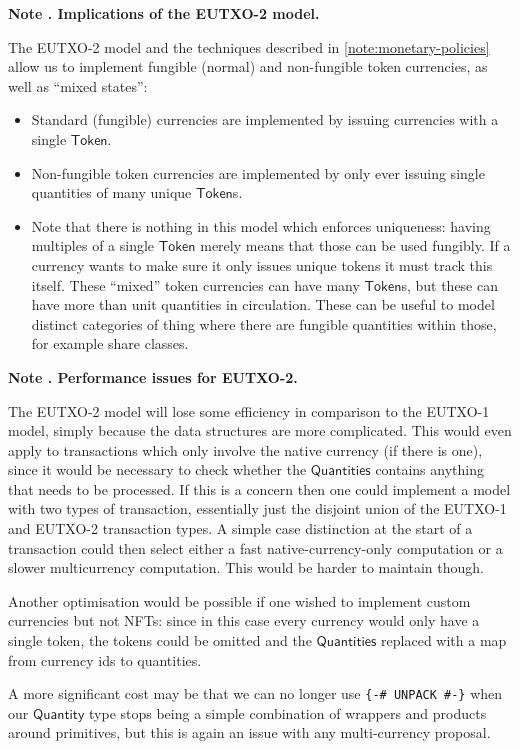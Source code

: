 \documentclass[a4paper]{article}
\newcounter{note}
\newcommand{\note}[1]{
  \bigskip
  \refstepcounter{note}
  \noindent\textbf{Note \thenote. #1}
}
\newcommand{\s}{\textsf}  %
\newcommand{\qty}{\ensuremath{\s{Quantity}}}
\newcommand{\token}{\ensuremath{\s{Token}}}
\newcommand{\qtymap}{\ensuremath{\s{Quantities}}}
\begin{document}
\note{Implications of the EUTXO-2 model.}
\label{note:eutxo-2-implications}
The EUTXO-2 model and the techniques described in
\cref{note:monetary-policies} allow us to implement fungible
(normal) and non-fungible token currencies, as well as ``mixed
states'':
\begin{itemize}
\item Standard (fungible) currencies are implemented by issuing
  currencies with a single \token{}.
\item Non-fungible token currencies are implemented by only ever
  issuing single quantities of many unique \token{}s.
\item Note that there is nothing in this model which enforces
  uniqueness: having multiples of a single \token{} merely means that
  those can be used fungibly. If a currency wants to make sure it only
  issues unique tokens it must track this itself.  These ``mixed'' token
  currencies can have many \token{}s, but these can have more than unit
  quantities in circulation.  These can be useful to model distinct
  categories of thing where there are fungible quantities within
  those, for example share classes.
\end{itemize}

\note{Performance issues for EUTXO-2.}
\label{note:eutxo-2-performance}
The EUTXO-2 model will lose some efficiency in comparison to the EUTXO-1
model, simply because the data structures are more complicated.  This
would even apply to transactions which only involve the native
currency (if there is one), since it would be necessary to check whether the \qtymap{}
contains anything that needs to be processed.  If this is a concern
then one could implement a model with two types of transaction,
essentially just the disjoint union of the EUTXO-1 and EUTXO-2
transaction types. A simple case distinction at the start of a
transaction could then select either a fast native-currency-only
computation or a slower multicurrency computation.  This would be
harder to maintain though.

\smallskip  Another optimisation would be possible if one wished to
implement custom currencies but not NFTs: since in this case every
currency would only have a single token, the tokens could be omitted
and the \qtymap{} replaced with a map from currency ids to quantities.

\smallskip A more significant cost may be that we can no longer use
\verb|{-# UNPACK #-}| when our \qty{} type stops being a simple
combination of wrappers and products around primitives, but this is
again an issue with any multi-currency proposal.


\end{document}

